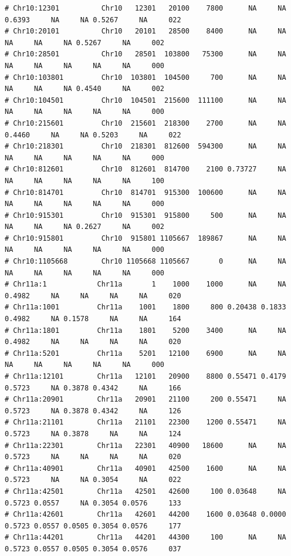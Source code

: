 \documentclass{article}\usepackage[]{graphicx}\usepackage[]{color}
\makeatletter
\newenvironment{kframe}{%
 \def\at@end@of@kframe{}%
 \ifinner\ifhmode%
  \def\at@end@of@kframe{\end{minipage}}%
  \begin{minipage}{\columnwidth}%
 \fi\fi%
 \def\FrameCommand##1{\hskip\@totalleftmargin \hskip-\fboxsep
 \colorbox{shadecolor}{##1}\hskip-\fboxsep
     \hskip-\linewidth \hskip-\@totalleftmargin \hskip\columnwidth}%
 \MakeFramed {\advance\hsize-\width
   \@totalleftmargin\z@ \linewidth\hsize
   \@setminipage}}%
 {\par\unskip\endMakeFramed%
 \at@end@of@kframe}
\newenvironment{knitrout}{}{} %
\makeatother
\begin{document}
\begin{knitrout}
\begin{kframe}
\begin{verbatim}
# Chr10:12301          Chr10   12301   20100    7800      NA     NA 0.6393     NA     NA 0.5267     NA     022
# Chr10:20101          Chr10   20101   28500    8400      NA     NA     NA     NA     NA 0.5267     NA     002
# Chr10:28501          Chr10   28501  103800   75300      NA     NA     NA     NA     NA     NA     NA     000
# Chr10:103801         Chr10  103801  104500     700      NA     NA     NA     NA     NA 0.4540     NA     002
# Chr10:104501         Chr10  104501  215600  111100      NA     NA     NA     NA     NA     NA     NA     000
# Chr10:215601         Chr10  215601  218300    2700      NA     NA 0.4460     NA     NA 0.5203     NA     022
# Chr10:218301         Chr10  218301  812600  594300      NA     NA     NA     NA     NA     NA     NA     000
# Chr10:812601         Chr10  812601  814700    2100 0.73727     NA     NA     NA     NA     NA     NA     100
# Chr10:814701         Chr10  814701  915300  100600      NA     NA     NA     NA     NA     NA     NA     000
# Chr10:915301         Chr10  915301  915800     500      NA     NA     NA     NA     NA 0.2627     NA     002
# Chr10:915801         Chr10  915801 1105667  189867      NA     NA     NA     NA     NA     NA     NA     000
# Chr10:1105668        Chr10 1105668 1105667       0      NA     NA     NA     NA     NA     NA     NA     000
# Chr11a:1            Chr11a       1    1000    1000      NA     NA 0.4982     NA     NA     NA     NA     020
# Chr11a:1001         Chr11a    1001    1800     800 0.20438 0.1833 0.4982     NA 0.1578     NA     NA     164
# Chr11a:1801         Chr11a    1801    5200    3400      NA     NA 0.4982     NA     NA     NA     NA     020
# Chr11a:5201         Chr11a    5201   12100    6900      NA     NA     NA     NA     NA     NA     NA     000
# Chr11a:12101        Chr11a   12101   20900    8800 0.55471 0.4179 0.5723     NA 0.3878 0.4342     NA     166
# Chr11a:20901        Chr11a   20901   21100     200 0.55471     NA 0.5723     NA 0.3878 0.4342     NA     126
# Chr11a:21101        Chr11a   21101   22300    1200 0.55471     NA 0.5723     NA 0.3878     NA     NA     124
# Chr11a:22301        Chr11a   22301   40900   18600      NA     NA 0.5723     NA     NA     NA     NA     020
# Chr11a:40901        Chr11a   40901   42500    1600      NA     NA 0.5723     NA     NA 0.3054     NA     022
# Chr11a:42501        Chr11a   42501   42600     100 0.03648     NA 0.5723 0.0557     NA 0.3054 0.0576     133
# Chr11a:42601        Chr11a   42601   44200    1600 0.03648 0.0000 0.5723 0.0557 0.0505 0.3054 0.0576     177
# Chr11a:44201        Chr11a   44201   44300     100      NA     NA 0.5723 0.0557 0.0505 0.3054 0.0576     037

\end{verbatim}
\end{kframe}
\end{knitrout}
\end{document}
